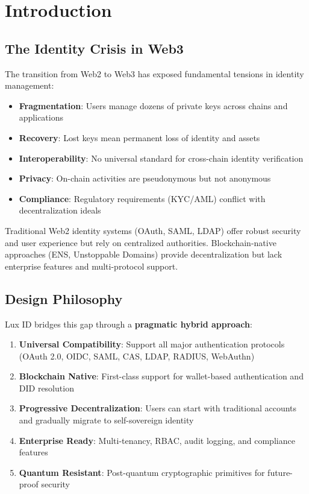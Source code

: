 \documentclass[11pt,a4paper]{article}
\begin{document}
\tableofcontents
\newpage

\section{Introduction}

\subsection{The Identity Crisis in Web3}

The transition from Web2 to Web3 has exposed fundamental tensions in identity management:

\begin{itemize}
  \item \textbf{Fragmentation}: Users manage dozens of private keys across chains and applications
  \item \textbf{Recovery}: Lost keys mean permanent loss of identity and assets
  \item \textbf{Interoperability}: No universal standard for cross-chain identity verification
  \item \textbf{Privacy}: On-chain activities are pseudonymous but not anonymous
  \item \textbf{Compliance}: Regulatory requirements (KYC/AML) conflict with decentralization ideals
\end{itemize}

Traditional Web2 identity systems (OAuth, SAML, LDAP) offer robust security and user experience but rely on centralized authorities. Blockchain-native approaches (ENS, Unstoppable Domains) provide decentralization but lack enterprise features and multi-protocol support.

\subsection{Design Philosophy}

Lux ID bridges this gap through a \textbf{pragmatic hybrid approach}:

\begin{enumerate}
  \item \textbf{Universal Compatibility}: Support all major authentication protocols (OAuth 2.0, OIDC, SAML, CAS, LDAP, RADIUS, WebAuthn)
  \item \textbf{Blockchain Native}: First-class support for wallet-based authentication and DID resolution
  \item \textbf{Progressive Decentralization}: Users can start with traditional accounts and gradually migrate to self-sovereign identity
  \item \textbf{Enterprise Ready}: Multi-tenancy, RBAC, audit logging, and compliance features
  \item \textbf{Quantum Resistant}: Post-quantum cryptographic primitives for future-proof security
\end{enumerate}
\end{document}
